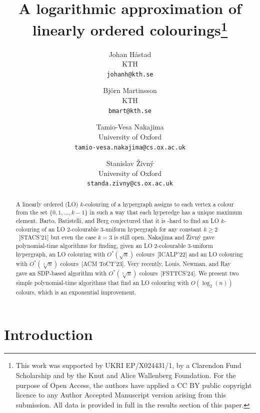 \documentclass[a4paper,11pt]{article}
\theoremstyle{plain}
\theoremstyle{definition}
\begin{document}
\author{Johan H{\aa}stad\\
KTH\\
\texttt{johanh@kth.se}
\and
Bj{\"o}rn Martinsson\\
KTH\\
\texttt{bmart@kth.se}
\and
Tamio-Vesa Nakajima\\
University of Oxford\\
\texttt{tamio-vesa.nakajima@cs.ox.ac.uk}
\and
Stanislav \v{Z}ivn\'y\\
University of Oxford\\
\texttt{standa.zivny@cs.ox.ac.uk}
}

\title{A logarithmic approximation of linearly ordered colourings\thanks{This
work was supported by UKRI EP/X024431/1, by a Clarendon Fund Scholarship and
by the Knut and Alice Wallenberg Foundation. For
the purpose of Open Access, the authors have applied a CC BY public copyright
licence to any Author Accepted Manuscript version arising from this submission.
All data is provided in full in the results section of this paper.}}

\date{}
\maketitle

\begin{abstract}
    A linearly ordered (LO) $k$-colouring of a hypergraph 
    assigns to each vertex a colour from the set $\{0,1,\ldots,k-1\}$ in such a way that
    each hyperedge has a unique maximum element. Barto, Batistelli, and Berg
    conjectured that it is \NP-hard to find an LO $k$-colouring of an LO
    2-colourable 3-uniform hypergraph for any constant $k\geq 2$~[STACS'21] but even the case
    $k=3$ is still open. Nakajima and \v{Z}ivn\'{y} gave 
    polynomial-time algorithms for finding, given an LO 2-colourable 3-uniform
    hypergraph, an LO colouring with $O^*(\sqrt{n})$ colours~[ICALP'22] and an
    LO colouring with $O^*(\sqrt[3]{n})$ colours~[ACM ToCT'23]. Very recently,
    Louis, Newman, and Ray gave an SDP-based algorithm with $O^*(\sqrt[5]{n})$
    colours~[FSTTCS'24]. We present two
    simple polynomial-time algorithms that find an LO colouring with
    $O(\log_2(n))$ colours, which is an exponential improvement.
\end{abstract}

\section{Introduction}
\end{document}
